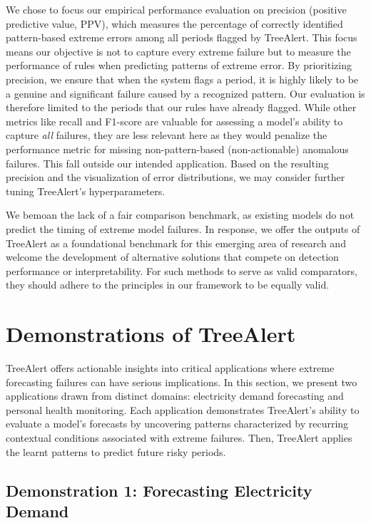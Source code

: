 \documentclass[ijds,sglanonrev]{informs4}
\begin{document}
We chose to focus our empirical performance evaluation on precision (positive predictive value, PPV), which measures the percentage of correctly identified pattern-based extreme errors among all periods flagged by TreeAlert. This focus means our objective is not to capture every extreme failure but to measure the performance of rules when predicting patterns of extreme error. By prioritizing precision, we ensure that when the system flags a period, it is highly likely to be a genuine and significant failure caused by a recognized pattern. Our evaluation is therefore limited to the periods that our rules have already flagged. While other metrics like recall and F1-score are valuable for assessing a model's ability to capture \emph{all} failures, they are less relevant here as they would penalize the performance metric for missing non-pattern-based (non-actionable) anomalous failures. This fall outside our intended application. Based on the resulting precision and the visualization of error distributions, we may consider further tuning TreeAlert's hyperparameters.

We bemoan the lack of a fair comparison benchmark, as existing models do not predict the timing of extreme model failures. In response, we offer the outputs of TreeAlert as a foundational benchmark for this emerging area of research and welcome the development of alternative solutions %
that compete on detection performance or interpretability. For such methods to serve as valid comparators, they should adhere to the principles in our framework to be equally valid.

\section{Demonstrations of TreeAlert }\label{sec-demo}

TreeAlert offers actionable insights into critical applications where extreme forecasting failures can have serious implications. In this section, we present two applications drawn from distinct domains: electricity demand forecasting and personal health monitoring. Each application demonstrates TreeAlert’s ability to evaluate a model’s forecasts by uncovering patterns characterized by recurring contextual conditions associated with extreme failures. Then, TreeAlert applies the learnt patterns to predict future risky periods.

\subsection{Demonstration 1: Forecasting Electricity Demand}
\end{document}
